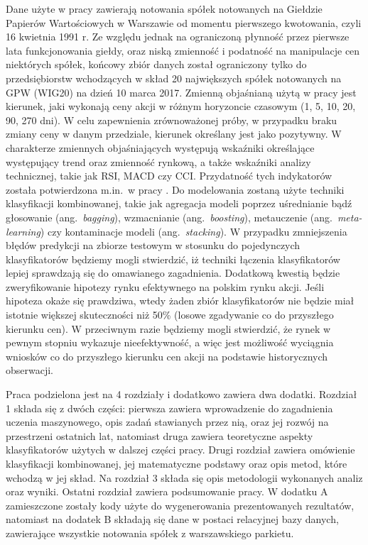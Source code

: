 \documentclass[12pt,a4paper,twoside,openany]{book}
\begin{document}
Dane użyte w pracy zawierają notowania spółek notowanych na Giełdzie Papierów Wartościowych w Warszawie od momentu pierwszego kwotowania, czyli 16 kwietnia 1991 r. Ze względu jednak na ograniczoną płynność przez pierwsze lata funkcjonowania giełdy, oraz niską zmienność i podatność na manipulacje cen niektórych spółek, końcowy zbiór danych został ograniczony tylko do przedsiębiorstw wchodzących w skład 20 największych spółek notowanych na GPW (WIG20) na dzień 10 marca 2017.  Zmienną objaśnianą użytą w pracy jest kierunek, jaki wykonają ceny akcji w różnym horyzoncie czasowym (1, 5, 10, 20, 90, 270 dni). W celu zapewnienia zrównoważonej próby, w przypadku braku zmiany ceny w danym przedziale, kierunek określany jest jako pozytywny. W charakterze zmiennych objaśniających występują wskaźniki określające występujący trend oraz zmienność rynkową, a także wskaźniki analizy technicznej, takie jak RSI, MACD czy CCI. Przydatność tych indykatorów została potwierdzona m.in.~w pracy \citet{wong2003}. Do modelowania zostaną użyte techniki klasyfikacji kombinowanej, takie jak agregacja modeli poprzez uśrednianie bądź głosowanie (ang.~\textit{bagging}), wzmacnianie (ang.~\textit{boosting}), metauczenie (ang.~\textit{meta-learning}) czy kontaminacje modeli (ang.~\textit{stacking}). W przypadku zmniejszenia błędów predykcji na zbiorze testowym w stosunku do pojedynczych klasyfikatorów będziemy mogli stwierdzić, iż techniki łączenia klasyfikatorów lepiej sprawdzają się do omawianego zagadnienia. Dodatkową kwestią będzie zweryfikowanie hipotezy rynku efektywnego na polskim rynku akcji. Jeśli hipoteza okaże się prawdziwa, wtedy żaden zbiór klasyfikatorów nie będzie miał istotnie większej skuteczności niż 50\% (losowe zgadywanie co do przyszłego kierunku cen). W przeciwnym razie będziemy mogli stwierdzić, że rynek w pewnym stopniu wykazuje nieefektywność, a więc jest możliwość wyciągnia wniosków co do przyszłego kierunku cen akcji na podstawie historycznych obserwacji. 

Praca podzielona jest na 4 rozdziały i dodatkowo zawiera dwa dodatki. Rozdział 1 składa się z dwóch części: pierwsza zawiera wprowadzenie do zagadnienia uczenia maszynowego, opis zadań stawianych przez nią, oraz jej rozwój na przestrzeni ostatnich lat, natomiast druga zawiera teoretyczne aspekty klasyfikatorów użytych w dalszej części pracy. Drugi rozdział zawiera omówienie klasyfikacji kombinowanej, jej matematyczne podstawy oraz opis metod, które wchodzą w jej skład. Na rozdział 3 składa się opis metodologii wykonanych analiz oraz wyniki. Ostatni rozdział zawiera podsumowanie pracy. W dodatku A zamieszczone zostały kody użyte do wygenerowania prezentowanych rezultatów, natomiast na dodatek B składają się dane w postaci relacyjnej bazy danych, zawierające wszystkie notowania spółek z warszawskiego parkietu.
\end{document}

